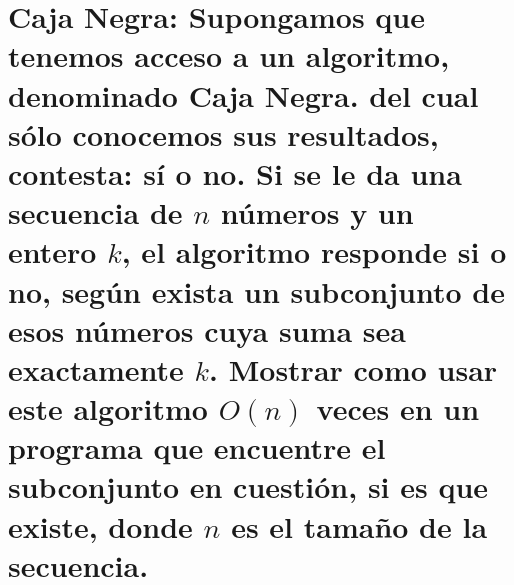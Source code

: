 \section{Caja Negra: Supongamos que tenemos acceso a un algoritmo, denominado Caja Negra. del cual sólo conocemos sus resultados, contesta: sí o no.
Si se le da una secuencia de $n$ números y un entero $k$,  el algoritmo responde si o no, según exista un subconjunto de esos números cuya suma sea exactamente $k$.
Mostrar como usar este algoritmo $O(n)$ veces en un programa que encuentre el subconjunto en cuestión, si es que existe, donde $n$ es el tamaño de la secuencia.}


